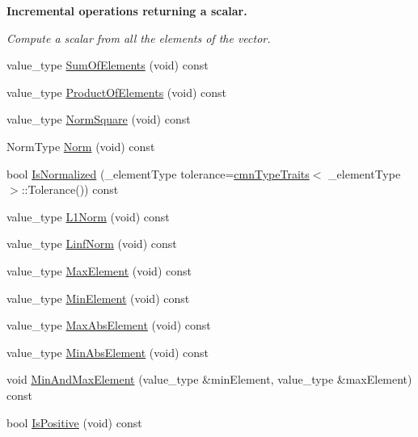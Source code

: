 \begin{Indent}{\bf Incremental operations returning a scalar.}\par
{\em Compute a scalar from all the elements of the vector. }\begin{DoxyCompactItemize}
\item 
value\+\_\+type \hyperlink{classvct_fixed_size_const_vector_base_ac511673c2790b811713df7728f65b5da}{Sum\+Of\+Elements} (void) const 
\item 
value\+\_\+type \hyperlink{classvct_fixed_size_const_vector_base_a826fd6b5c97c074d6c0484cc107bb31e}{Product\+Of\+Elements} (void) const 
\item 
value\+\_\+type \hyperlink{classvct_fixed_size_const_vector_base_a5a865a5e5eceae4e781620f83efa54b4}{Norm\+Square} (void) const 
\item 
Norm\+Type \hyperlink{classvct_fixed_size_const_vector_base_a43f0c7b075985c9ad43df78aa3af48cf}{Norm} (void) const 
\item 
bool \hyperlink{classvct_fixed_size_const_vector_base_a137a8c27c0ac4c69d82603d8ccc57ff5}{Is\+Normalized} (\+\_\+element\+Type tolerance=\hyperlink{classcmn_type_traits}{cmn\+Type\+Traits}$<$ \+\_\+element\+Type $>$\+::Tolerance()) const 
\item 
value\+\_\+type \hyperlink{classvct_fixed_size_const_vector_base_a24e2d1c86fbfa08de36508830bcd18a5}{L1\+Norm} (void) const 
\item 
value\+\_\+type \hyperlink{classvct_fixed_size_const_vector_base_a6cc25d43b07b0e85cebf697f4473013a}{Linf\+Norm} (void) const 
\item 
value\+\_\+type \hyperlink{classvct_fixed_size_const_vector_base_ae8a9354f4981167ad4b32ebc46718075}{Max\+Element} (void) const 
\item 
value\+\_\+type \hyperlink{classvct_fixed_size_const_vector_base_a3f26bcaaecf71aaf2e4150a1cba75310}{Min\+Element} (void) const 
\item 
value\+\_\+type \hyperlink{classvct_fixed_size_const_vector_base_adec6fb220a9ea13e9fb0ecae8ad1785b}{Max\+Abs\+Element} (void) const 
\item 
value\+\_\+type \hyperlink{classvct_fixed_size_const_vector_base_a841b82fc4780be7d5c992b9d75f4ccbc}{Min\+Abs\+Element} (void) const 
\item 
void \hyperlink{classvct_fixed_size_const_vector_base_a53a918269efce35fdb84addc8d694b2d}{Min\+And\+Max\+Element} (value\+\_\+type \&min\+Element, value\+\_\+type \&max\+Element) const 
\item 
bool \hyperlink{classvct_fixed_size_const_vector_base_ada9b5030f7256d8ffb7aaf314db06e92}{Is\+Positive} (void) const 

\end{DoxyCompactItemize}
\end{Indent}
